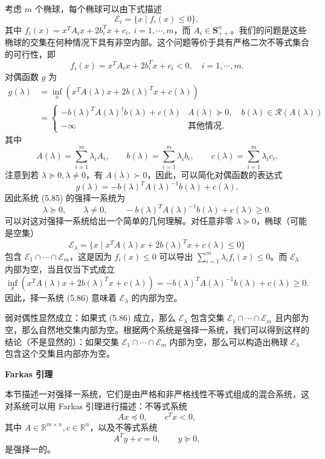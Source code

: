 \documentclass[UTF8, 12pt, fontset=fandol, oneside]{ctexart}
\begin{document}
考虑 $m$ 个椭球，每个椭球可以由下式描述
\[
\mathcal{E}_i=\{x\mid f_i(x)\leq 0\},
\]
其中 $f_i(x)=x^TA_ix+2b_i^Tx+c_i,\ i=1,\cdots,m$，而 $A_i\in\mathbf{S}_{++}^n$。我们的问题是这些椭球的交集在何种情况下具有非空内部。这个问题等价于具有严格二次不等式集合的可行性，即
\begin{equation}
f_i(x)=x^TA_ix+2b_i^Tx+c_i<0,\quad i=1,\cdots,m.
\tag{5.85}
\end{equation}
对偶函数 $g$ 为
\[
\begin{aligned}
g(\lambda)
&=\inf_x\left(x^TA(\lambda)x+2b(\lambda)^Tx+c(\lambda)\right)\\
&=
\begin{cases}
-b(\lambda)^TA(\lambda)^\dagger b(\lambda)+c(\lambda) & A(\lambda)\succeq 0,\quad b(\lambda)\in\mathcal{R}(A(\lambda))\\
-\infty & \text{其他情况},
\end{cases}
\end{aligned}
\]
其中
\[
A(\lambda)=\sum_{i=1}^m\lambda_i A_i,\qquad
b(\lambda)=\sum_{i=1}^m\lambda_i b_i,\qquad
c(\lambda)=\sum_{i=1}^m\lambda_i c_i.
\]
注意到若 $\lambda\succeq 0,\lambda\neq 0$，有 $A(\lambda)\succ 0$，因此，可以简化对偶函数的表达式
\[
g(\lambda)=-b(\lambda)^TA(\lambda)^{-1}b(\lambda)+c(\lambda).
\]
因此系统 (5.85) 的强择一系统为
\begin{equation}
\lambda\succeq 0,\qquad \lambda\neq 0,\qquad -b(\lambda)^TA(\lambda)^{-1}b(\lambda)+c(\lambda)\geq 0.
\tag{5.86}
\end{equation}
可以对这对强择一系统给出一个简单的几何理解。对任意非零 $\lambda\succeq 0$，椭球（可能是空集）
\[
\mathcal{E}_\lambda=\{x\mid x^TA(\lambda)x+2b(\lambda)^Tx+c(\lambda)\leq 0\}
\]
包含 $\mathcal{E}_1\cap\cdots\cap\mathcal{E}_m$，这是因为 $f_i(x)\leq 0$ 可以导出 $\sum_{i=1}^m\lambda_i f_i(x)\leq 0$。而 $\mathcal{E}_\lambda$ 内部为空，当且仅当下式成立
\[
\inf_x\left(x^TA(\lambda)x+2b(\lambda)^Tx+c(\lambda)\right)
=-b(\lambda)^TA(\lambda)^{-1}b(\lambda)+c(\lambda)\geq 0.
\]
因此，择一系统 (5.86) 意味着 $\mathcal{E}_\lambda$ 的内部为空。

弱对偶性显然成立：如果式 (5.86) 成立，那么 $\mathcal{E}_\lambda$ 包含交集 $\mathcal{E}_1\cap\cdots\cap\mathcal{E}_m$ 且内部为空，那么自然地交集内部为空。根据两个系统是强择一系统，我们可以得到这样的结论（不是显然的）：如果交集 $\mathcal{E}_1\cap\cdots\cap\mathcal{E}_m$ 内部为空，那么可以构造出椭球 $\mathcal{E}_\lambda$ 包含这个交集且内部亦为空。

\noindent\textbf{Farkas 引理}

本节描述一对强择一系统，它们是由严格和非严格线性不等式组成的混合系统，这对系统可以用 Farkas 引理进行描述：不等式系统
\begin{equation}
Ax\preceq 0,\qquad c^Tx<0,
\tag{5.87}
\end{equation}
其中 $A\in\mathbb{R}^{m\times n},c\in\mathbb{R}^n$，以及不等式系统
\begin{equation}
A^Ty+c=0,\qquad y\succeq 0,
\tag{5.88}
\end{equation}
是强择一的。
\end{document}
